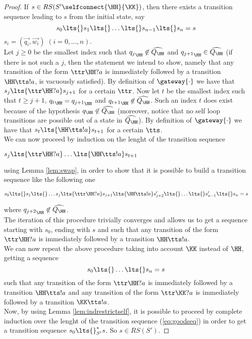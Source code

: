 \begin{proof}
If $s \in RS(S'\selfconnect{\HH}{\KK})$, then there exists a transition sequence leading to $s$ from the initial state, say
$$s_0\lts{}s_1\lts{} \ldots\lts{} s_{n-1}\lts{}s_n=s$$
$s_i = (\vec{q_i},\vec{w_i})$ $(i=0,\ldots,n)$.\\
Let $j \geq 0$ be the smallest index such that ${q_j}_\HH\not\in \widehat{Q_\HH}$ and  ${q_{j+1}}_\HH\in \widehat{Q_\HH}$
(if there is not such a $j$, then the statement we intend to show, namely that
 any transition of the form $\ttr\HH?a$ is immediately followed by a transition $\HH\tts!a$,
is vacuously satisfied).
By definition of $\gateway{\cdot}$ we have that $s_j\lts{\ttr\HH?a} s_{j+1}$ for a certain $\ttr$.
Now let $t$ be the smallest index such that  $t\geq j+1$, ${q_t}_\HH = {q_{j+1}}_\HH$ and ${q_{t+1}}_\HH\not\in \widehat{Q_\HH}$.
Such an index $t$ does exist because of the hypothesis $q_\HH\not\in\widehat{Q_\HH}$
(moreover, notice that no self loop transitions are possible out of a state in $\widehat{Q_\HH}$).
By definition of $\gateway{\cdot}$ we have that $s_{t}\lts{\HH\tts!a} s_{t+1}$ for a certain $\tts$.\\
We can now proceed by induction on the lenght of the transition sequence
\centerline{
$s_j\lts{\ttr\HH?a} \ldots \lts{\HH\tts!a}s_{t+1}$
}
using Lemma \ref{lem:swap}, in order to show that 
it is possible to build a transition sequence like the following one\\
\centerline{
$s_0\lts{}s_1\lts{}\ldots s_j\lts{\ttr\HH?a} s_{j+1}\lts{\HH\tts!a} s'_{j+2} \lts{} \ldots \lts{}s'_{n-1}\lts{}s_n=s$
}
where ${q_{j+2}}_\HH\not\in \widehat{Q_\HH}$.\\
The iteration of this procedure trivially converges and allows us to get 
a sequence
starting with $s_0$, ending with $s$ and 
such that
any transition of the form $\ttr\HH?a$ is immediately followed by a transition $\HH\tts!a$.\\
We can now repeat the above procedure taking into account $\KK$ instead of $\HH$, getting a sequence
\begin{equation}
\label{eq:goodseq}
s_0\lts{}\ldots  \lts{}s_n=s
\end{equation}
such that any transition of the form $\ttr\HH?a$ is immediately followed by a transition $\HH\tts!a$
and any transition of the form  $\ttr\KK?a$ is immediately followed by a transition $\KK\tts!a$.\\


Now, by using Lemma \ref{lem:indrestrictself}, it is possible to proceed by complete induction over the 
lenght of the transition sequence (\ref{eq:goodseq})
in order to get a transition sequence ${s_0} \lts{}_{S'}^* {s}$. So $s\in RS(S')$.
\end{proof}

